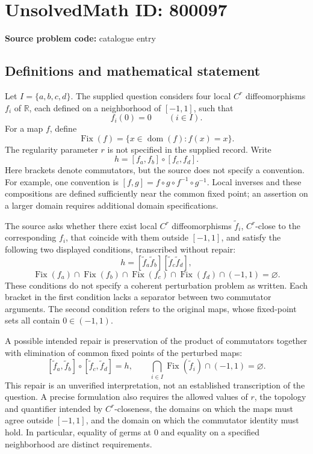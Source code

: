 \documentclass[11pt]{article}
\newcommand{\R}{\mathbb{R}}
\begin{document}
\section*{UnsolvedMath ID: 800097}
\textbf{Source problem code:} catalogue entry
\subsection{Definitions and mathematical statement}
Let \(I=\{a,b,c,d\}\). The supplied question considers four local \(C^r\) diffeomorphisms \(f_i\) of \(\R\), each defined on a neighborhood of \([-1,1]\), such that
\[
f_i(0)=0\qquad(i\in I).
\]
For a map \(f\), define
\[
\operatorname{Fix}(f)=\{x\in\operatorname{dom}(f):f(x)=x\}.
\]
The regularity parameter \(r\) is not specified in the supplied record. Write
\[
h=[f_a,f_b]\circ[f_c,f_d].
\]
Here brackets denote commutators, but the source does not specify a convention. For example, one convention is \([f,g]=f\circ g\circ f^{-1}\circ g^{-1}\). Local inverses and these compositions are defined sufficiently near the common fixed point; an assertion on a larger domain requires additional domain specifications.

The source asks whether there exist local \(C^r\) diffeomorphisms \(\tilde f_i\), \(C^r\)-close to the corresponding \(f_i\), that coincide with them outside \([-1,1]\), and satisfy the following two displayed conditions, transcribed without repair:
\[
h=[\tilde f_a\tilde f_b][\tilde f_c\tilde f_d],
\]
\[
\operatorname{Fix}(f_a)\cap\operatorname{Fix}(f_b)\cap
\operatorname{Fix}(f_c)\cap\operatorname{Fix}(f_d)\cap(-1,1)=\varnothing.
\]
These conditions do not specify a coherent perturbation problem as written. Each bracket in the first condition lacks a separator between two commutator arguments. The second condition refers to the original maps, whose fixed-point sets all contain \(0\in(-1,1)\).

A possible intended repair is preservation of the product of commutators together with elimination of common fixed points of the perturbed maps:
\[
[\tilde f_a,\tilde f_b]\circ[\tilde f_c,\tilde f_d]=h,
\qquad
\bigcap_{i\in I}\operatorname{Fix}(\tilde f_i)\cap(-1,1)=\varnothing.
\]
This repair is an unverified interpretation, not an established transcription of the question. A precise formulation also requires the allowed values of \(r\), the topology and quantifier intended by \(C^r\)-closeness, the domains on which the maps must agree outside \([-1,1]\), and the domain on which the commutator identity must hold. In particular, equality of germs at \(0\) and equality on a specified neighborhood are distinct requirements.
\end{document}
